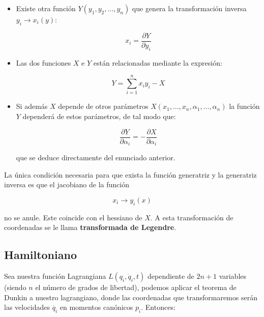 \documentclass[12pt,a4paper]{book}
\newcommand{\parciales}[2]{\frac{\partial #1}{\partial #2}}
\begin{document}
\begin{itemize}
\item Existe otra función $Y(y_1,y_2,\ldots,y_n)$ que genera la transformación inversa $y_i \rightarrow x_i(y)$:

\begin{equation}
x_i = \parciales{Y}{y_i}
\end{equation}

\item Las dos funciones $X$ e $Y$ están relacionadas mediante la expresión:

\begin{equation}
Y = \sum_{i=1}^n x_i y_i - X
\end{equation}

\item Si además $X$ depende de otros parámetros $X(x_1,\ldots,x_n,\alpha_1,\ldots,\alpha_n)$ la función $Y$ dependerá de estos parámetros, de tal modo que:

\begin{equation}
\parciales{Y}{\alpha_i} =  - \parciales{X}{\alpha_i}
\end{equation}

que se deduce directamente del enunciado anterior.
\end{itemize}

La única condición necesaria para que exista la función generatriz y la generatriz inversa es que el jacobiano de la función

$$ x_i \rightarrow y_i (x) $$ 

no se anule. Este coincide con el hessiano de $X$. A esta transformación de coordenadas se le llama \textbf{transformada de Legendre}.


\subsection{Hamiltoniano}

Sea nuestra función Lagrangiana $L(q_i,\dot{q}_i,t)$ dependiente de $2n+1$ variables (siendo $n$ el número de grados de libertad), podemos aplicar el teorema de Dunkin a nuestro lagrangiano, donde las coordenadas que transformaremos serán las velocidades $\dot{q_i}$ en momentos canónicos $p_i$. Entonces:
\end{document}
